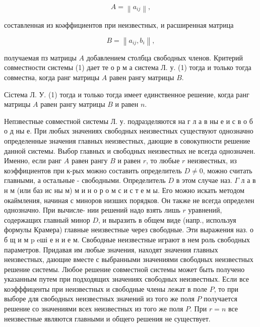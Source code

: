 \documentclass[10pt]{article}
\begin{document}
\[

A=\left\|a_{i j}\right\|,

\]



составленная из коәффициентов при неизвестных, и расширенная матрица



\[

B=\left\|a_{i j}, b_{i}\right\|,

\]



получаемая пз матрицы $A$ добавлением столбца свободных членов. Критерий совместности системы (1) дает те о р м а система Л. у. (1) тогда и только тогда совместна, когда ранг матрицы $A$ равен рангу матрицы $B$.



Сістема Л. У. (1) тогда и только тогда имеет единственное решение, когда ранг матрицы $A$ равен рангу матрицы $B$ и равен $n$.



Непзвестные совместной системы Л. у. подразделяются на г л а в ны е и с в о б о д ны е. При любых значениях свободных неизвестных существуют однозначно определенные значения главных неизвестных, дающие в совокупности решение данной системы. Выбор главных и свободных неизвестных не всегда однозначен. Именно, если ранг $A$ равен рангу $B$ и равен $r$, то любые $r$ неизвестных, из коэффициентов при к-рых можно составить определитель $D \neq 0$, можно считать главными, а остальные - свободными. Определитель $D$ в этом случае наз. $\Gamma$ л а в н м (или баз ис ны м) м и н о р о м с и с т е м ы. Его можно искать методом окаймления, начиная с миноров низших порядков. Он также не всегда определен однозначно. При вычисле- нии решений надо взять лишь $r$ уравнений, содержащих главный минор $D$, и выразить в общем виде (напр., используя формулы Крамера) главные неизвестные через свободные. Эти выражения наз. о б щ и м p eші е н и е м. Свободные неизвестные играют в нем роль свободных параметров. Придавая им любые значения, находят значения главных неизвестных, дающие вместе с выбранными значениями свободных неизвестных решение системы. Любое решение совместной системы может быть получено указанным путем при подходящих значениях свободных неизвестных. Если все коэфффиценты при неизвестных и свободные члены лежат в поле $P$, то при выборе для свободных неизвестных значений из того же поля $P$ получается решение со значениями всех неизвестных из того же поля $P$. При $r=n$ все неизвестные являются главными и общего решения не существует.
\end{document}
